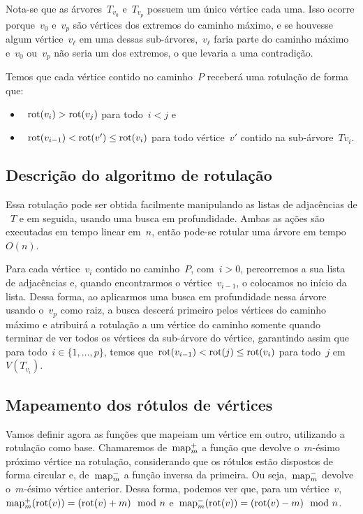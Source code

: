 	\bigskip

	Nota-se que as árvores~$T_{v_0}$ e~$T_{v_p}$ possuem um único
	vértice cada uma. 
	Isso ocorre porque~$v_0$ e~$v_p$ são vértices dos extremos
	do caminho máximo, e se houvesse algum vértice~$v_\ell$ em uma
	dessas sub-árvores,~$v_\ell$ faria parte do caminho máximo
	e~$v_0$ ou~$v_p$ não seria um dos extremos, o que levaria a 
	uma contradição.

	\bigskip

	Temos que cada vértice contido no caminho~$P$ receberá 
	uma rotulação de forma que:
	\begin{itemize}
		\item~$\mathrm{rot}(v_i)>\mathrm{rot}(v_j)$ para todo~$i<j$ e
		\item~${\mathrm{rot}(v_{i-1})<\mathrm{rot}(v') \le \mathrm{rot}(v_i)}$ para todo 
		vértice~$v'$ contido na sub-árvore~$T{v_i}$. 
	\end{itemize}

	\bigskip
	\bigskip

	\subsection{Descrição do algoritmo de rotulação}
	Essa rotulação pode ser obtida facilmente 
	manipulando as listas de adjacências de ~$T$ e em seguida,
	usando uma busca em profundidade.
	Ambas as ações são executadas em tempo linear em~$n$, então
	pode-se rotular uma árvore em tempo~$O(n)$.

	Para cada vértice~$v_i$ contido no caminho~$P$, com~$i>0$,
	percorremos a sua lista de adjacências e, quando encontrarmos o 
	vértice~$v_{i-1}$, o colocamos no início da lista.
	Dessa forma, ao aplicarmos uma busca em profundidade nessa 
	árvore usando o~$v_p$ como raiz, a busca descerá primeiro
	pelos vértices do caminho máximo e atribuirá a rotulação
	a um vértice do caminho
	somente quando terminar de ver todos os vértices da sub-árvore
	do vértice, 
	garantindo assim que para todo~$i\in \{1,\ldots, p\}$, temos 
	que~$\mathrm{rot}(v_{i-1})<\mathrm{rot}(j)\le\mathrm{rot}(v_i)$ para todo~$j$ 
	em~$V(T_{v_i})$.
	
	\bigskip
	\bigskip
	\bigskip

	\subsection{Mapeamento dos rótulos de vértices }
	\label{sec:map}
	Vamos definir agora as funções que mapeiam um vértice em 
	outro, utilizando a rotulação como base.
	Chamaremos de~${\mathrm{map}^+_m}$ a função que devolve o~$m$-ésimo 
	próximo vértice na rotulação, considerando que os rótulos
	estão dispostos de forma circular
	e, de~${\mathrm{map}^-_m}$ a função inversa da primeira. 
	Ou seja,~${\mathrm{map}^-_m}$ devolve o~$m$-ésimo vértice anterior.
	Dessa forma, podemos ver que, para um 
	vértice~$v$,~${\mathrm{map}^+_m(\mathrm{rot}(v)) =(\mathrm{rot}(v)+m)\mod n}$ 
	e~${\mathrm{map}^-_m(\mathrm{rot}(v)) =(\mathrm{rot}(v)-m)\mod n}$.

